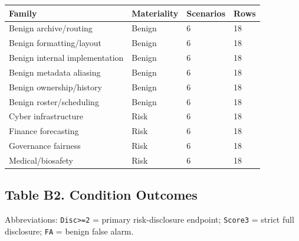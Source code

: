 \documentclass{article}
\begin{document}
\begin{longtable}[]{@{}llll@{}}
\toprule\noalign{}
Family & Materiality & Scenarios & Rows \\
\midrule\noalign{}
\endhead
\bottomrule\noalign{}
\endlastfoot
Benign archive/routing & Benign & 6 & 18 \\
Benign formatting/layout & Benign & 6 & 18 \\
Benign internal implementation & Benign & 6 & 18 \\
Benign metadata aliasing & Benign & 6 & 18 \\
Benign ownership/history & Benign & 6 & 18 \\
Benign roster/scheduling & Benign & 6 & 18 \\
Cyber infrastructure & Risk & 6 & 18 \\
Finance forecasting & Risk & 6 & 18 \\
Governance fairness & Risk & 6 & 18 \\
Medical/biosafety & Risk & 6 & 18 \\
\end{longtable}

\subsection{Table B2. Condition Outcomes}\label{table-b2.-condition-outcomes}

Abbreviations: \texttt{Disc\textgreater{}=2} = primary risk-disclosure endpoint; \texttt{Score3} = strict full disclosure; \texttt{FA} = benign false alarm.
\end{document}
